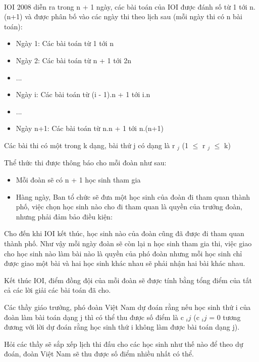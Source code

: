  

IOI 2008 diễn ra trong n + 1 ngày, các bài toán của IOI được đánh số từ 1 tới n.(n+1) và được phân bố vào các ngày thi theo lịch sau (mỗi ngày thi có n bài toán):
\begin{itemize}
	\item Ngày 1: Các bài toán từ 1 tới n
	\item Ngày 2: Các bài toán từ n + 1 tới 2n
	\item ...
	\item Ngày i: Các bài toán từ (i - 1).n + 1 tới i.n
	\item ...
	\item Ngày n+1: Các bài toán từ n.n + 1 tới n.(n+1)
\end{itemize}

Các bài thi có một trong k dạng, bài thứ j có dạng là r $_ j $ (1  $\le$  r $_ j $  $\le$  k)

Thể thức thi được thông báo cho mỗi đoàn như sau:
\begin{itemize}
	\item Mỗi đoàn sẽ có n + 1 học sinh tham gia
	\item Hàng ngày, Ban tổ chức sẽ đưa một học sinh của đoàn đi tham quan thành phố, việc chọn học sinh nào cho đi tham quan là quyền của trưởng đoàn, nhưng phải đảm bảo điều kiện:
\end{itemize}

Cho đến khi IOI kết thúc, học sinh nào của đoàn cũng đã được đi tham quan thành phố. Như vậy mỗi ngày đoàn sẽ còn lại n học sinh tham gia thi, việc giao cho học sinh nào làm bài nào là quyền của phó đoàn nhưng mỗi học sinh chỉ được giao một bài và hai học sinh khác nhau sẽ phải nhận hai bài khác nhau.

Kết thúc IOI, điểm đồng đội của mỗi đoàn sẽ được tính bằng tổng điểm của tất cả các lời giải các bài toán đã cho.

Các thầy giáo trưởng, phó đoàn Việt Nam dự đoán rằng nếu học sinh thứ i của đoàn làm bài toán dạng j thì có thể thu được số điểm là c $_ ij $ (c $_ ij $ = 0 tương đương với lời dự đoán rằng học sinh thứ i không làm được bài toán dạng j).

Hỏi các thầy sẽ sắp xếp lịch thi đấu cho các học sinh như thế nào để theo dự đoán, đoàn Việt Nam sẽ thu được số điểm nhiều nhất có thể.